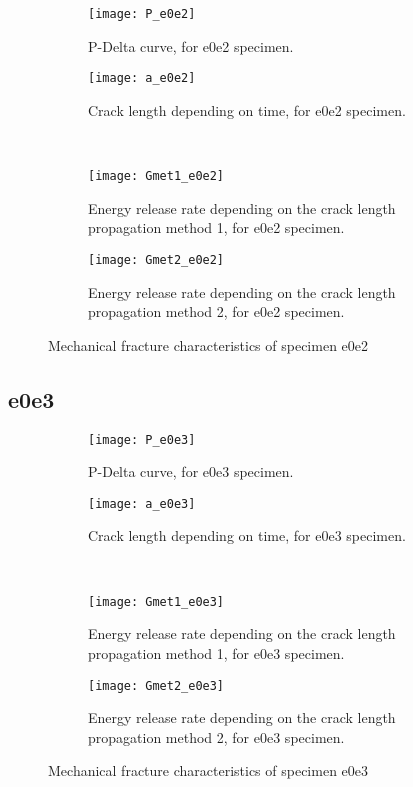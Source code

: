 \begin{figure}[H]
	\centering
	\begin{subfigure}{0.48\linewidth}
		\centering
		\texttt{[image: P\_e0e2]}
		\decoRule
		\caption{P-Delta curve, for e0e2 specimen.}
		\label{fig:P_e0e2}
	\end{subfigure}
	\hfill 
	\begin{subfigure}{0.48\linewidth}
		\centering
		\texttt{[image: a\_e0e2]}
		\decoRule
		\caption{Crack length depending on time, for e0e2 specimen.}
		\label{fig:a_e0e2}
	\end{subfigure}
	\hfill\\
	\begin{subfigure}{0.48\linewidth}
		\centering
		\texttt{[image: Gmet1\_e0e2]}
		\decoRule
		\caption{Energy release rate depending on the crack length propagation method 1, for e0e2 specimen.}
		\label{fig:Gmet1_e0e2}
	\end{subfigure}
	\hfill
	\begin{subfigure}{0.48\linewidth}
		\centering
		\texttt{[image: Gmet2\_e0e2]}
		\decoRule
		\caption{Energy release rate depending on the crack length propagation method 2, for e0e2 specimen.}
		\label{fig:Gmet2_e0e2}
	\end{subfigure}
	\caption{Mechanical fracture characteristics of specimen e0e2}
	\label{e0e2}
\end{figure}

\subsection{e0e3}

\begin{figure}[H]
	\centering
	\begin{subfigure}{0.48\linewidth}
		\centering
		\texttt{[image: P\_e0e3]}
		\decoRule
		\caption{P-Delta curve, for e0e3 specimen.}
		\label{fig:P_e0e3}
	\end{subfigure}
	\hfill 
	\begin{subfigure}{0.48\linewidth}
		\centering
		\texttt{[image: a\_e0e3]}
		\decoRule
		\caption{Crack length depending on time, for e0e3 specimen.}
		\label{fig:a_e0e3}
	\end{subfigure}
	\hfill\\
	\begin{subfigure}{0.48\linewidth}
		\centering
		\texttt{[image: Gmet1\_e0e3]}
		\decoRule
		\caption{Energy release rate depending on the crack length propagation method 1, for e0e3 specimen.}
		\label{fig:Gmet1_e0e3}
	\end{subfigure}
	\hfill
	\begin{subfigure}{0.48\linewidth}
		\centering
		\texttt{[image: Gmet2\_e0e3]}
		\decoRule
		\caption{Energy release rate depending on the crack length propagation method 2, for e0e3 specimen.}
		\label{fig:Gmet2_e0e3}
	\end{subfigure}
	\caption{Mechanical fracture characteristics of specimen e0e3}
	\label{e0e3}
\end{figure}

